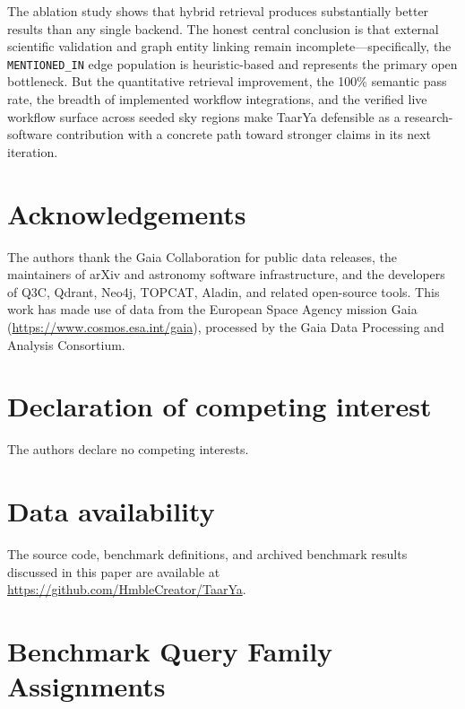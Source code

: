 \documentclass[12pt]{elsarticle}
\begin{document}
The ablation study shows that hybrid retrieval produces substantially better results than any single backend. The honest central conclusion is that external scientific validation and graph entity linking remain incomplete---specifically, the \texttt{MENTIONED\_IN} edge population is heuristic-based and represents the primary open bottleneck. But the quantitative retrieval improvement, the 100\% semantic pass rate, the breadth of implemented workflow integrations, and the verified live workflow surface across \nClusterNodes{} seeded sky regions make \textsf{TaarYa} defensible as a research-software contribution with a concrete path toward stronger claims in its next iteration.

\section*{Acknowledgements}

The authors thank the Gaia Collaboration for public data releases, the maintainers of arXiv and astronomy software infrastructure, and the developers of Q3C, Qdrant, Neo4j, TOPCAT, Aladin, and related open-source tools. This work has made use of data from the European Space Agency mission Gaia (\url{https://www.cosmos.esa.int/gaia}), processed by the Gaia Data Processing and Analysis Consortium.

\section*{Declaration of competing interest}
The authors declare no competing interests.

\section*{Data availability}
The source code, benchmark definitions, and archived benchmark results discussed in this paper are available at \url{https://github.com/HmbleCreator/TaarYa}.




\appendix

\section{Benchmark Query Family Assignments}
\label{app:benchmark}
\end{document}
